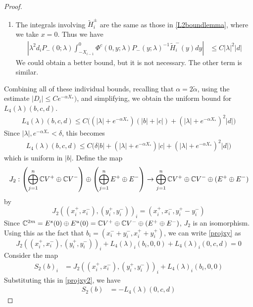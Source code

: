 \documentclass[thesis.tex]{subfiles}
\begin{document}
\begin{lemma}
\begin{proof}
\begin{enumerate}
\item The integrals involving $\tilde{H}_i^\pm$ are the same as those in \cref{L2boundlemma}, where we take $x = 0$. Thus we have
\begin{align*}
\left| \lambda^2 d_i P_-(0; \lambda) \int_{-X_{i-1}}^0 \Phi^c(0, y; \lambda) P_-(y; \lambda)^{-1} \tilde{H}_i^-(y) dy \right| &\leq C |\lambda|^2 |d| 
\end{align*}
We could obtain a better bound, but it is not necessary. The other term is similar.
\end{enumerate}

Combining all of these individual bounds, recalling that $\alpha = 2 \tilde{\alpha}$, using the estimate $|D_i| \leq C e^{-\alpha X_*})$, and simplifying, we obtain the uniform bound for $L_4(\lambda)(b, c, d)$.
\begin{align*}
L_4(\lambda)(b, c, d) \leq 
C\Big( (|\lambda| + e^{-\alpha X_*})(|b| + |c|) + (|\lambda| + e^{-\alpha X_*})^2 |d|  \Big) 
\end{align*}
Since $|\lambda|, e^{-\alpha X_*} < \delta$, this becomes
\begin{align*}
L_4(\lambda)(b, c, d) \leq 
C\Big( \delta |b| + (|\lambda| + e^{-\alpha X_*})|c| + (|\lambda| + e^{-\alpha X_*})^2 |d| \Big) 
\end{align*}
which is uniform in $|b|$. Define the map
\[
J_2: \left( \bigoplus_{j=1}^n \mathbb{C} V^+ \oplus \mathbb{C} V^- \right) \oplus
\left( \bigoplus_{j=1}^n E^+ \oplus E^- \right) 
\rightarrow \bigoplus_{j=1}^n \mathbb{C} V^+ \oplus \mathbb{C} V^- \oplus (E^+ \oplus E^-)
\]
by 
\[
J_2( (x_i^+, x_i^-),(y_i^+, y_i^-))_i = ( x_i^+, x_i^-, y_i^+ - y_i^- )
\]
Since $\mathbb{C}^{2m} = E^s(0) \oplus E^u(0) = \mathbb{C} V^+ \oplus \mathbb{C} V^- \oplus (E^+ \oplus E^-)$, $J_2$ is an isomorphism. Using this as the fact that $b_i = (x_i^- + y_i^-, x_i^+ + y_i^+)$, we can write \eqref{projxy} as
\begin{equation}\label{projxy2}
J_2( (x_i^+, x_i^-),(y_i^+, y_i^-))_i 
+ L_4(\lambda)_i(b_i, 0, 0) + L_4(\lambda)_i(0, c, d) = 0
\end{equation}
Consider the map
\begin{align*}
S_2(b)_i &= J_2( (x_i^+, x_i^-),(y_i^+, y_i^-))_i 
+ L_4(\lambda)_i(b_i, 0, 0) 
\end{align*}
Substituting this in \eqref{projxy2}, we have
\begin{align*}
S_2(b) &= -L_4(\lambda)(0, c, d)
\end{align*}


\end{proof}
\end{lemma}
\end{document}
